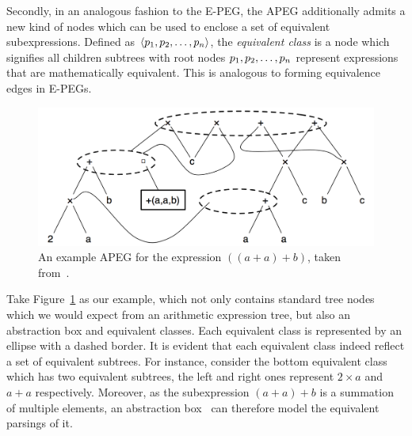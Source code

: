 Secondly, in an analogous fashion to the E-PEG, the APEG additionally
admits a new kind of nodes which can be used to enclose a set of equivalent
subexpressions.  Defined as $\langle p_1, p_2, \mathellipsis, p_n \rangle$,
the \emph{equivalent class} is a node which signifies all children subtrees
with root nodes $p_1, p_2, \mathellipsis, p_n$ represent expressions that are
mathematically equivalent.  This is analogous to forming equivalence edges in
E-PEGs.

\begin{figure}[ht]
    \centering
    \includegraphics[scale=0.4]{bg/fig/apeg.png}
    \caption{%
        An example APEG for the expression $\left( \left( a + a \right) + b
        \right)$, taken from~\cite{martel12}.}\label{bg:fig:apeg}
\end{figure}
Take Figure~\ref{bg:fig:apeg} as our example, which not only contains standard
tree nodes which we would expect from an arithmetic expression tree, but
also an abstraction box and equivalent classes.  Each equivalent class is
represented by an ellipse with a dashed border.  It is evident that each
equivalent class indeed reflect a set of equivalent subtrees.  For instance,
consider the bottom equivalent class which has two equivalent subtrees, the
left and right ones represent $2 \times a$ and $a + a$ respectively.  Moreover,
as the subexpression $(a + a) + b$ is a summation of multiple elements, an
abstraction box \, can therefore model the equivalent
parsings of it.

